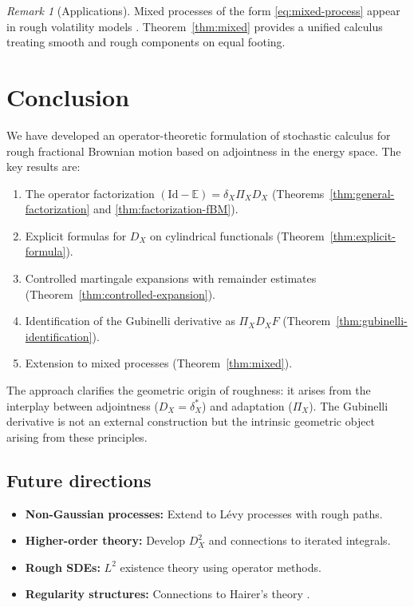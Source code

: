 \documentclass[11pt,a4paper]{article}
\theoremstyle{plain}
\theoremstyle{definition}
\theoremstyle{remark}
\newtheorem{remark}[theorem]{Remark}
\newcommand{\E}{\mathbb{E}}
\newcommand{\Id}{\mathrm{Id}}
\newcommand{\Lp}[1]{L^{#1}}
\begin{document}
\begin{remark}[Applications]\label{rem:applications}
Mixed processes of the form \eqref{eq:mixed-process} appear in rough volatility models \cite{BFG16}. Theorem~\ref{thm:mixed} provides a unified calculus treating smooth and rough components on equal footing.
\end{remark}

\section{Conclusion}

We have developed an operator-theoretic formulation of stochastic calculus for rough fractional Brownian motion based on adjointness in the energy space. The key results are:

\begin{enumerate}
\item The operator factorization $(\Id - \E) = \delta_X \Pi_X D_X$ (Theorems~\ref{thm:general-factorization} and \ref{thm:factorization-fBM}).

\item Explicit formulas for $D_X$ on cylindrical functionals (Theorem~\ref{thm:explicit-formula}).

\item Controlled martingale expansions with remainder estimates (Theorem~\ref{thm:controlled-expansion}).

\item Identification of the Gubinelli derivative as $\Pi_X D_X F$ (Theorem~\ref{thm:gubinelli-identification}).

\item Extension to mixed processes (Theorem~\ref{thm:mixed}).
\end{enumerate}

The approach clarifies the geometric origin of roughness: it arises from the interplay between adjointness ($D_X = \delta_X^*$) and adaptation ($\Pi_X$). The Gubinelli derivative is not an external construction but the intrinsic geometric object arising from these principles.

\subsection{Future directions}

\begin{itemize}
\item \textbf{Non-Gaussian processes:} Extend to L\'evy processes with rough paths.
\item \textbf{Higher-order theory:} Develop $D_X^2$ and connections to iterated integrals.
\item \textbf{Rough SDEs:} $\Lp{2}$ existence theory using operator methods.
\item \textbf{Regularity structures:} Connections to Hairer's theory \cite{Hairer14}.
\end{itemize}
\end{document}
